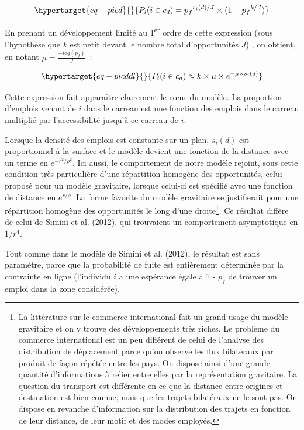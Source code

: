 \documentclass[
  10pt,
  a4paper,
  numbers=noendperiod,
  DIV=9]{scrartcl}
\begin{document}
\begin{equation}\protect\hypertarget{eq-picd}{}{
P_i(i\in c_d) = {p_f}^{s_i(d)/J}\times(1-{p_f}^{ k/J})
}\label{eq-picd}\end{equation}

En prenant un développement limité au 1\textsuperscript{er} ordre de
cette expression (sous l'hypothèse que \(k\) est petit devant le nombre
total d'opportunités \(J\)) , on obtient, en notant
\(\mu=\frac{-log(p_f)}{J}\)~:

\begin{equation}\protect\hypertarget{eq-picddl}{}{
P_i(i\in c_d) \approx k\times \mu \times e^{-\mu \times s_i(d)}
}\label{eq-picddl}\end{equation}

Cette expression fait apparaître clairement le cœur du modèle. La
proportion d'emplois venant de \(i\) dans le carreau est une fonction
des emplois dans le carreau multiplié par l'accessibilité jusqu'à ce
carreau de \(i\).

Lorsque la densité des emplois est constante sur un plan, \(s_i(d)\) est
proportionnel à la surface et le modèle devient une fonction de la
distance avec un terme en \(e^{-r^2/\rho^2}\). Ici aussi, le
comportement de notre modèle rejoint, sous cette condition très
particulière d'une répartition homogène des opportunités, celui proposé
pour un modèle gravitaire, lorsque celui-ci est spécifié avec une
fonction de distance en \(e^{r/\rho}\). La forme favorite du modèle
gravitaire se justifierait pour une répartition homogène des
opportunités le long d'une droite\footnote{La littérature sur le
  commerce international fait un grand usage du modèle gravitaire et on
  y trouve des développements très riches. Le problème du commerce
  international est un peu différent de celui de l'analyse des
  distribution de déplacement parce qu'on observe les flux bilatéraux
  par produit de façon répétée entre les pays. On dispose ainsi d'une
  grande quantité d'informations à relier entre elles par la
  représentation gravitaire. La question du transport est différente en
  ce que la distance entre origines et destination est bien connue, mais
  que les trajets bilatéraux ne le sont pas. On dispose en revanche
  d'information sur la distribution des trajets en fonction de leur
  distance, de leur motif et des modes employés.}. Ce résultat diffère
de celui de Simini et al. (2012), qui trouvaient un comportement
asymptotique en \(1/r^4\).

Tout comme dans le modèle de Simini et al. (2012), le résultat est sans
paramètre, parce que la probabilité de fuite est entièrement déterminée
par la contrainte en ligne (l'individu \(i\) a une espérance égale à 1 -
\(p_f\) de trouver un emploi dans la zone considérée).
\end{document}
